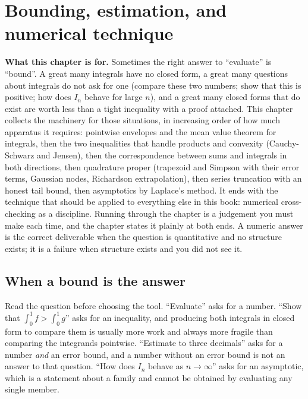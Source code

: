 \chapter{Bounding, estimation, and numerical technique}

\begin{orient}
\textbf{What this chapter is for.} Sometimes the right answer to ``evaluate'' is ``bound''. A great many integrals have no closed form, a great many questions about integrals do not ask for one (compare these two numbers; show that this is positive; how does $I_{n}$ behave for large $n$), and a great many closed forms that do exist are worth less than a tight inequality with a proof attached. This chapter collects the machinery for those situations, in increasing order of how much apparatus it requires: pointwise envelopes and the mean value theorem for integrals, then the two inequalities that handle products and convexity (Cauchy-Schwarz and Jensen), then the correspondence between sums and integrals in both directions, then quadrature proper (trapezoid and Simpson with their error terms, Gaussian nodes, Richardson extrapolation), then series truncation with an honest tail bound, then asymptotics by Laplace's method. It ends with the technique that should be applied to everything else in this book: numerical cross-checking as a discipline. Running through the chapter is a judgement you must make each time, and the chapter states it plainly at both ends. A numeric answer is the correct deliverable when the question is quantitative and no structure exists; it is a failure when structure exists and you did not see it.
\end{orient}

\section{When a bound is the answer}

Read the question before choosing the tool. ``Evaluate'' asks for a number. ``Show that $\int_0^{1}f>\int_0^{1}g$'' asks for an inequality, and producing both integrals in closed form to compare them is usually more work and always more fragile than comparing the integrands pointwise. ``Estimate to three decimals'' asks for a number \emph{and} an error bound, and a number without an error bound is not an answer to that question. ``How does $I_{n}$ behave as $n\to\infty$'' asks for an asymptotic, which is a statement about a family and cannot be obtained by evaluating any single member.

